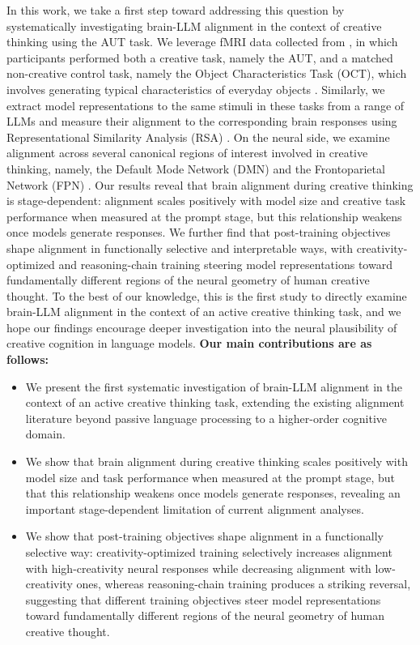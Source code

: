 In this work, we take a first step toward addressing this question by systematically investigating brain-LLM alignment in the context of creative thinking using the AUT task. We leverage fMRI data collected from \citet{beaty2018robust}, in which participants performed both a creative task, namely the AUT, and a matched non-creative control task, namely the Object Characteristics Task (OCT), which involves generating typical characteristics of everyday objects \citep{beaty2018robust}. Similarly, we extract model representations to the same stimuli in these tasks from a range of LLMs and measure their alignment to the corresponding brain responses using Representational Similarity Analysis (RSA) \citep{kriegeskorte2008representational}. On the neural side, we examine alignment across several canonical regions of interest involved in creative thinking, namely, the Default Mode Network (DMN) and the Frontoparietal Network (FPN) \citep{luchini2025role, liu2024neural}. 
Our results reveal that brain alignment during creative thinking is stage-dependent: alignment scales positively with model size and creative task performance when measured at the prompt stage, but this relationship weakens once models generate responses. We further find that post-training objectives shape alignment in functionally selective and interpretable ways, with creativity-optimized and reasoning-chain training steering model representations toward fundamentally different regions of the neural geometry of human creative thought. To the best of our knowledge, this is the first study to directly examine brain-LLM alignment in the context of an active creative thinking task, and we hope our findings encourage deeper investigation into the neural plausibility of creative cognition in language models. \textbf{Our main contributions are as follows:}
\begin{itemize}
\item We present the first systematic investigation of brain-LLM alignment in the context of an active creative thinking task, extending the existing alignment literature beyond passive language processing to a higher-order cognitive domain.
\item We show that brain alignment during creative thinking scales positively with model size and task performance when measured at the prompt stage, but that this relationship weakens once models generate responses, revealing an important stage-dependent limitation of current alignment analyses.
\item We show that post-training objectives shape alignment in a functionally selective way: creativity-optimized training selectively increases alignment with high-creativity neural responses while decreasing alignment with low-creativity ones, whereas reasoning-chain training produces a striking reversal, suggesting that different training objectives steer model representations toward fundamentally different regions of the neural geometry of human creative thought.
\end{itemize}
